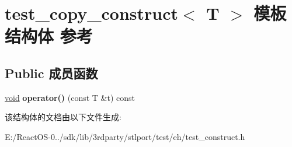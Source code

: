 \hypertarget{structtest__copy__construct}{}\section{test\+\_\+copy\+\_\+construct$<$ T $>$ 模板结构体 参考}
\label{structtest__copy__construct}
\subsection*{Public 成员函数}
\begin{DoxyCompactItemize}
\item 
\mbox{\label{structtest__copy__construct_a410bc5e080ce923a5a472c18f2dc47cf}} 
\hyperlink{interfacevoid}{void} {\bfseries operator()} (const T \&t) const
\end{DoxyCompactItemize}


该结构体的文档由以下文件生成\+:\begin{DoxyCompactItemize}
\item 
E\+:/\+React\+O\+S-\/0../sdk/lib/3rdparty/stlport/test/eh/test\+\_\+construct.\+h\end{DoxyCompactItemize}

